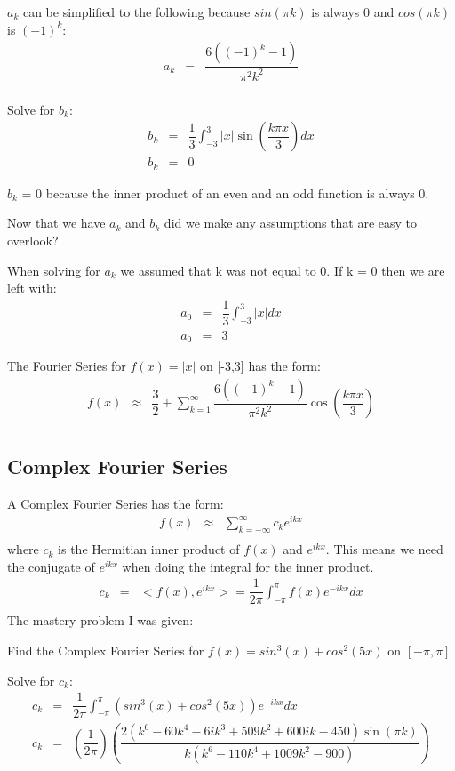 \documentclass{article}
\newcommand{\bea}{\begin{eqnarray*}}
\newcommand{\eea}{\end{eqnarray*}}
\newcommand{\blue}[1]{\textcolor{blue}{#1}}
\begin{document}
$a_k$ can be simplified to the following because $sin(\pi k)$ is always 0 and $cos(\pi k)$ is $(-1)^k$:
\bea
a_k &=& \dfrac{6((-1)^k-1)}{\pi^2 k^2}\\
\eea

Solve for $b_k$:
\bea
b_k &=& \dfrac{1}{3}\int_{-3}^{3} |x|\sin\left(\dfrac{k \pi x}{3}\right)dx\\
b_k &=& 0
\eea

$b_k$ = 0 because the inner product of an even and an odd function is always 0.\newline 

Now that we have $a_k$ and $b_k$ did we make any assumptions that are easy to overlook?\newline

When solving for $a_k$ we assumed that k was not equal to 0. If k = 0 then we are left with:
\bea
a_0 &=& \dfrac{1}{3}\int_{-3}^{3} |x|dx\\
a_0 &=& 3
\eea

The Fourier Series for $f(x) = |x|$ on [-3,3] has the form:
\bea
f(x) &\approx& \dfrac{3}{2}+\sum_{k=1}^{\infty} \dfrac{6((-1)^k-1)}{\pi^2 k^2}\cos\left(\dfrac{k \pi x}{3}\right) \\
\eea

\subsection{Complex Fourier Series}
A Complex Fourier Series has the form:
\bea
f(x) &\approx& \sum_{k=-\infty}^{\infty} c_ke^{ikx} \\
\eea
where $c_k$ is the Hermitian inner product of $f(x)$ and $e^{ikx}$. This means we need the conjugate of $e^{ikx}$ when doing the integral for the inner product.
\bea
c_k &=& <f(x),e^{ikx}> = \dfrac{1}{2\pi}\int_{-\pi}^{\pi} f(x)e^{-ikx}dx \\
\eea
The mastery problem I was given: \newline

Find the Complex Fourier Series for $f(x) = sin^3(x)+cos^2(5x)$ on $[-\pi,\pi]$

Solve for $c_k$:
\bea
c_k &=& \dfrac{1}{2\pi}\int_{-\pi}^{\pi} (sin^3(x)+cos^2(5x))e^{-ikx}dx\\
c_k &=& \left(\dfrac{1}{2\pi}\right)\left(\dfrac{2(k^6-60k^4-6ik^3+509k^2+600ik-450)\sin(\pi k)}{k(k^6-110k^4+1009k^2-900)}\right)\\
\eea
\end{document}
